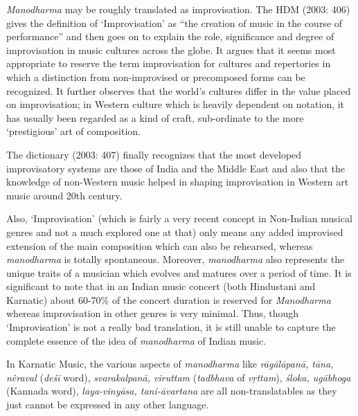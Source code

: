 \newpage

\textit{Manodharma} may be roughly translated as improvisation. The HDM (2003: 406) gives the definition of ‘Improvisation’ as “the creation of music in the course of performance” and then goes on to explain the role, significance and degree of improvisation in music cultures across the globe. It argues that it seems most appropriate to reserve the term improvisation for cultures and repertories in which a distinction from non-improvised or precomposed forms can be recognized. It further observes that the world’s cultures differ in the value placed on improvisation; in Western culture which is heavily dependent on notation, it has usually been regarded as a kind of craft, sub-ordinate to the more ‘prestigious’ art of composition.

The dictionary (2003: 407) finally recognizes that the most developed improvisatory systems are those of India and the Middle East and also that the knowledge of non-Western music helped in shaping improvisation in Western art music around 20th century.

Also, ‘Improvisation’ (which is fairly a very recent concept in Non-Indian musical genres and not a much explored one at that) only means any added improvised extension of the main composition which can also be rehearsed, whereas \textit{manodharma} is totally spontaneous. Moreover, \textit{manodharma} also represents the unique traits of a musician which evolves and matures over a period of time. It is significant to note that in an Indian music concert (both Hindustani and Karnatic) about 60-70\% of the concert duration is reserved for \textit{Manodharma} whereas improvisation in other genres is very minimal. Thus, though ‘Improvisation’ is not a really bad translation, it is still unable to capture the complete essence of the idea of \textit{manodharma} of Indian music.

In Karnatic Music, the various aspects of \textit{manodharma} like \textit{rāgālāpanā, tāna, nêraval} (\textit{deśī} word), \textit{svarakalpanā, viruttam} (\textit{tadbhava} of \textit{vṛttam}), \textit{śloka, ugābhoga} (Kannada word), \textit{laya-vinyāsa, tani-āvartana} are all non-translatables as they just cannot be expressed in any other language.


